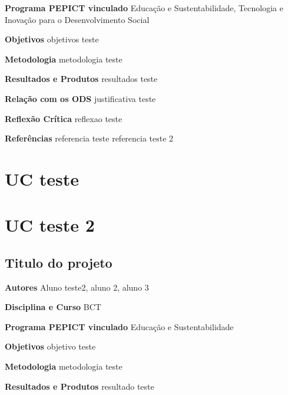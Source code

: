 \documentclass[12pt,openright,oneside,a4paper]{report}
\begin{document}
\vspace{0.7cm}
\noindent
\textbf{Programa PEPICT vinculado}
Educação e Sustentabilidade, Tecnologia e Inovação para o Desenvolvimento Social

\vspace{0.7cm}
\noindent
\textbf{Objetivos}
objetivos teste

\vspace{0.7cm}
\noindent
\textbf{Metodologia}
metodologia teste

\vspace{0.7cm}
\noindent
\textbf{Resultados e Produtos}
resultados teste

\vspace{0.7cm}
\noindent
\textbf{Relação com os ODS}
justificativa teste

\vspace{0.7cm}
\noindent
\textbf{Reflexão Crítica}
reflexao teste

\vspace{0.7cm}
\noindent
\textbf{Referências}
referencia teste
referencia teste 2

\vspace{0.7cm}
\chapter{UC teste}

\chapter{UC teste 2}

\newpage
\section{Titulo do projeto}
\noindent
\textbf{Autores}
Aluno teste2, aluno 2, aluno 3

\vspace{0.7cm}
\noindent
\textbf{Disciplina e Curso}
BCT

\vspace{0.7cm}
\noindent
\textbf{Programa PEPICT vinculado}
Educação e Sustentabilidade

\vspace{0.7cm}
\noindent
\textbf{Objetivos}
objetivo teste

\vspace{0.7cm}
\noindent
\textbf{Metodologia}
metodologia teste

\vspace{0.7cm}
\noindent
\textbf{Resultados e Produtos}
resultado teste
\end{document}
